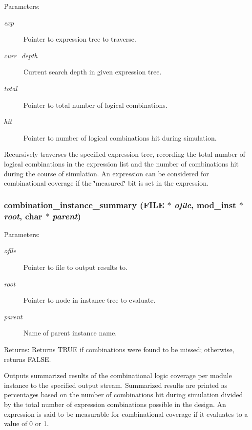 \begin{Desc}
\item[Parameters:]
\begin{description}
\item[{\em exp}]Pointer to expression tree to traverse. \item[{\em curr\_\-depth}]Current search depth in given expression tree. \item[{\em total}]Pointer to total number of logical combinations. \item[{\em hit}]Pointer to number of logical combinations hit during simulation.\end{description}
\end{Desc}
Recursively traverses the specified expression tree, recording the total number of logical combinations in the expression list and the number of combinations hit during the course of simulation. An expression can be considered for combinational coverage if the \char`\"{}measured\char`\"{} bit is set in the expression. 
\subsubsection{ combination\_\-instance\_\-summary (FILE $\ast$ {\em ofile}, {\bf mod\_\-inst} $\ast$ {\em root}, char $\ast$ {\em parent})}\label{comb_8c_a8}


\begin{Desc}
\item[Parameters:]
\begin{description}
\item[{\em ofile}]Pointer to file to output results to. \item[{\em root}]Pointer to node in instance tree to evaluate. \item[{\em parent}]Name of parent instance name.\end{description}
\end{Desc}
\begin{Desc}
\item[Returns:]Returns TRUE if combinations were found to be missed; otherwise, returns FALSE.\end{Desc}
Outputs summarized results of the combinational logic coverage per module instance to the specified output stream. Summarized results are printed as percentages based on the number of combinations hit during simulation divided by the total number of expression combinations possible in the design. An expression is said to be measurable for combinational coverage if it evaluates to a value of 0 or 1. 
